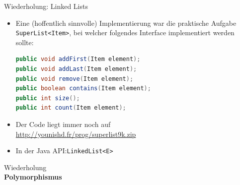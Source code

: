 \documentclass[18pt]{beamer}
\begin{document}
\begin{frame}[fragile]{Wiederholung: Linked Lists}
    \begin{itemize}
        \item Eine (hoffentlich sinnvolle) Implementierung war die praktische Aufgabe \texttt{SuperList<Item>},
        bei welcher folgendes Interface implementiert werden sollte:
        \begin{lstlisting}[language=Java,basicstyle=\scriptsize]
public void addFirst(Item element);
public void addLast(Item element);
public void remove(Item element);
public boolean contains(Item element);
public int size();
public int count(Item element);
        \end{lstlisting}

\pause
        \item Der Code liegt immer noch auf\\ \url{http://younishd.fr/prog/superlist9k.zip}

        \item In der Java API:\quad \texttt{LinkedList<E>}

    \end{itemize}
\end{frame}

\begin{frame}{\quad}
    \center
    \Huge{Wiederholung\\ \textbf{Polymorphismus}}
\end{frame}
\end{document}
